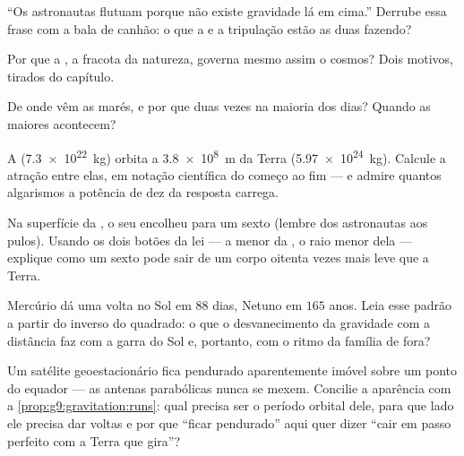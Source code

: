 \begin{exercise}[$\star$]\label{exo:g9:gravitation:6}
``Os astronautas flutuam porque não existe gravidade lá em cima.''
Derrube essa frase com a bala de canhão: o que a  e a
tripulação estão as duas fazendo?
\end{exercise}

\begin{exercise}[$\star$]\label{exo:g9:gravitation:7}
Por que a , a fracota da natureza, governa mesmo assim o
cosmos? Dois motivos, tirados do capítulo.
\end{exercise}

\begin{exercise}[$\star$]\label{exo:g9:gravitation:8}
De onde vêm as marés, e por que duas vezes na maioria dos dias?
Quando as maiores acontecem?
\end{exercise}

\begin{exercise}[$\star\star$]\label{exo:g9:gravitation:9}
A  (\qty{7.3e22}{kg}) orbita a \qty{3.8e8}{m} da Terra
(\qty{5.97e24}{kg}). Calcule a atração entre elas, em notação
científica do começo ao fim --- e admire quantos algarismos a potência
de dez da resposta carrega.
\end{exercise}

\begin{exercise}[$\star\star$]\label{exo:g9:gravitation:10}
Na superfície da , o seu  encolheu para um sexto (lembre dos
astronautas aos pulos). Usando os dois botões da lei --- a 
menor da , o raio menor dela --- explique como um sexto pode sair
de um corpo oitenta vezes mais leve que a Terra.
\end{exercise}

\begin{exercise}[$\star\star$]\label{exo:g9:gravitation:11}
Mercúrio dá uma volta no Sol em $88$ dias, Netuno em $165$ anos. Leia
esse padrão a partir do inverso do quadrado: o que o desvanecimento
da gravidade com a distância faz com a garra do Sol e, portanto, com
o ritmo da família de fora?
\end{exercise}

\begin{exercise}[$\star\star\star$]\label{exo:g9:gravitation:12}
Um satélite geoestacionário fica pendurado aparentemente imóvel sobre
um ponto do equador --- as antenas parabólicas nunca se mexem.
Concilie a aparência com a
\cref{prop:g9:gravitation:runs}: qual precisa ser o período orbital
dele, para que lado ele precisa dar voltas e por que ``ficar
pendurado'' aqui quer dizer ``cair em passo perfeito com a Terra que
gira''?
\end{exercise}


